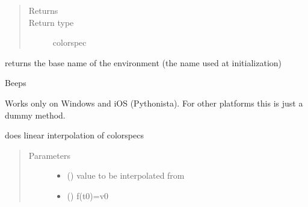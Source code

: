 \documentclass[letterpaper,10pt,english]{sphinxmanual}
\begin{document}
\begin{fulllineitems}
\begin{fulllineitems}
\begin{quote}
\begin{description}
\item[{Returns}] \leavevmode
{}

\item[{Return type}] \leavevmode
colorspec

\end{description}\end{quote}

\end{fulllineitems}


\begin{fulllineitems}
\label{\detokenize{Reference:salabim.Environment.base_name}}
returns the base name of the environment (the name used at initialization)

\end{fulllineitems}


\begin{fulllineitems}
\label{\detokenize{Reference:salabim.Environment.beep}}
Beeps

Works only on Windows and iOS (Pythonista). For other platforms this is just a dummy method.

\end{fulllineitems}


\begin{fulllineitems}
\label{\detokenize{Reference:salabim.Environment.colorinterpolate}}
does linear interpolation of colorspecs
\begin{quote}\begin{description}
\item[{Parameters}] \leavevmode\begin{itemize}
\item {} 
 () \textendash{} value to be interpolated from

\item {} 
 () \textendash{} f(t0)=v0


\end{itemize}
\end{description}
\end{quote}
\end{fulllineitems}
\end{fulllineitems}
\end{document}
